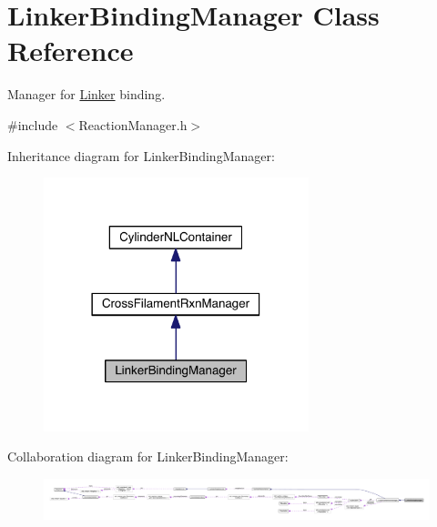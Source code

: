 \hypertarget{classLinkerBindingManager}{\section{Linker\+Binding\+Manager Class Reference}
\label{classLinkerBindingManager}
}


Manager for \hyperlink{classLinker}{Linker} binding.  




{\ttfamily \#include $<$Reaction\+Manager.\+h$>$}



Inheritance diagram for Linker\+Binding\+Manager\+:\nopagebreak
\begin{figure}[H]
\begin{center}
\leavevmode
\includegraphics[width=218pt]{classLinkerBindingManager__inherit__graph}
\end{center}
\end{figure}


Collaboration diagram for Linker\+Binding\+Manager\+:
\nopagebreak
\begin{figure}[H]
\begin{center}
\leavevmode
\includegraphics[width=350pt]{classLinkerBindingManager__coll__graph}
\end{center}
\end{figure}
